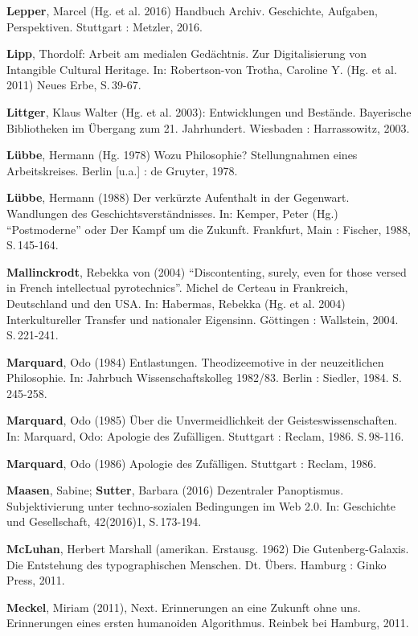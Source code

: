 \documentclass[a4paper,
fontsize=11pt,
oneside,
numbers=noperiodatend,
parskip=half-,
bibliography=totoc,
final
]{scrartcl}
\begin{document}
\textbf{Lepper}, Marcel (Hg. et al. 2016) Handbuch Archiv. Geschichte,
Aufgaben, Perspektiven. Stuttgart : Metzler, 2016.

\textbf{Lipp}, Thordolf: Arbeit am medialen Gedächtnis. Zur
Digitalisierung von Intangible Cultural Heritage. In: Robertson-von
Trotha, Caroline Y. (Hg. et al. 2011) Neues Erbe, S.\,39-67.

\textbf{Littger}, Klaus Walter (Hg. et al. 2003): Entwicklungen und
Bestände. Bayerische Bibliotheken im Übergang zum 21. Jahrhundert.
Wiesbaden : Harrassowitz, 2003.

\textbf{Lübbe}, Hermann (Hg. 1978) Wozu Philosophie? Stellungnahmen
eines Arbeitskreises. Berlin {[}u.a.{]} : de Gruyter, 1978.

\textbf{Lübbe}, Hermann (1988) Der verkürzte Aufenthalt in der
Gegenwart. Wandlungen des Geschichtsverständnisses. In: Kemper, Peter
(Hg.) \enquote{Postmoderne} oder Der Kampf um die Zukunft. Frankfurt,
Main : Fischer, 1988, S.\,145-164.

\textbf{Mallinckrodt}, Rebekka von (2004) \enquote{Discontenting,
surely, even for those versed in French intellectual pyrotechnics}.
Michel de Certeau in Frankreich, Deutschland und den USA. In: Habermas,
Rebekka (Hg. et al. 2004) Interkultureller Transfer und nationaler
Eigensinn. Göttingen : Wallstein, 2004. S.\,221-241.

\textbf{Marquard}, Odo (1984) Entlastungen. Theodizeemotive in der
neuzeitlichen Philosophie. In: Jahrbuch Wissenschaftskolleg 1982/83.
Berlin : Siedler, 1984. S.\,245-258.

\textbf{Marquard}, Odo (1985) Über die Unvermeidlichkeit der
Geisteswissenschaften. In: Marquard, Odo: Apologie des Zufälligen.
Stuttgart : Reclam, 1986. S.\,98-116.

\textbf{Marquard}, Odo (1986) Apologie des Zufälligen. Stuttgart :
Reclam, 1986.

\textbf{Maasen}, Sabine; \textbf{Sutter}, Barbara (2016) Dezentraler
Panoptismus. Subjektivierung unter techno-sozialen Bedingungen im Web
2.0. In: Geschichte und Gesellschaft, 42(2016)1, S.\,173-194.

\textbf{McLuhan}, Herbert Marshall (amerikan. Erstausg. 1962) Die
Gutenberg-Galaxis. Die Entstehung des typographischen Menschen. Dt.
Übers. Hamburg : Ginko Press, 2011.

\textbf{Meckel}, Miriam (2011), Next. Erinnerungen an eine Zukunft ohne
uns. Erinnerungen eines ersten humanoiden Algorithmus. Reinbek bei
Hamburg, 2011.
\end{document}
